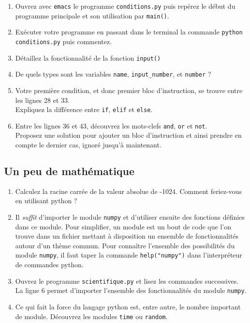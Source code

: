 \begin{enumerate}

\item  Ouvrez avec  \texttt{emacs} le  programme \texttt{conditions.py}
  puis repérez le début du programme principale et son utilisation par
  \texttt{main()}.
  
\item Exécuter votre programme en passant dans le terminal la commande
  \texttt{python conditions.py} puis commentez.

\item Détaillez la fonctionnalité de la fonction \texttt{input()}

\item De quels types sont les variables \texttt{name}, \texttt{input\_number}, 
et \texttt{number} ?

\item Votre première  condition, et donc premier  bloc d'instruction, se
  trouve entre  les lignes 28  et 33.\\ Expliquez la  différence entre
  \texttt{if}, \texttt{elif} et \texttt{else}.

\item  Entre   les  lignes  36   et  43,  découvrez  les   mots-clefs
  \texttt{and}, \texttt{or}  et \texttt{not}.\\ Proposez  une solution
  pour ajouter  un bloc  d'instruction et ainsi  prendre en  compte le
  dernier cas, ignoré jusqu'à maintenant.


\end{enumerate}



\subsection{Un peu de mathématique}

\begin{enumerate}
\item Calculez la racine carrée de la valeur absolue de -1024.
  Comment feriez-vous en utilisant python ?

\item Il \textit{suffit} d'importer le module \texttt{numpy} et d'utiliser ensuite
  des fonctions définies dans ce module.
  Pour simplifier, un module est un bout de code que l'on trouve dans un fichier
  mettant à disposition un ensemble de fonctionnalités autour d'un thème commun.
  Pour connaître l'ensemble des possibilités du module \texttt{numpy}, il faut taper la commande
  \texttt{help("numpy")} dans l'interpréteur de commandes python.


\item Ouvrez le programme \texttt{scientifique.py} et lisez les commandes successives.
  La ligne 6 permet d'importer l'ensemble des fonctionnalités du module \texttt{numpy}.

\item Ce qui fait la force du langage python est, entre autre, le nombre important de module.
  Découvrez les modules \texttt{time} ou \texttt{random}.


\end{enumerate}

